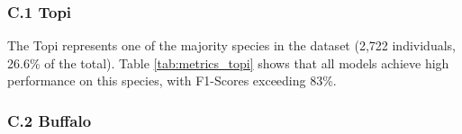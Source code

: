 \subsubsection*{C.1 Topi}

The Topi represents one of the majority species in the dataset (2,722 individuals, 26.6\% of the total). Table \ref{tab:metrics_topi} shows that all models achieve high performance on this species, with F1-Scores exceeding 83\%.

\begin{table}[ht]
\centering
\caption{Performance metrics for the Topi species (Phase 2).}
\label{tab:metrics_topi}
\end{table}

\subsubsection*{C.2 Buffalo}

